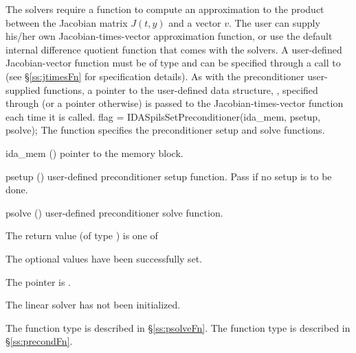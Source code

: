 {
The {\idaspils} solvers require a function to compute an approximation to the
product between the Jacobian matrix $J(t,y)$ and a vector $v$.
The user can supply his/her own Jacobian-times-vector approximation function, 
or use the default internal difference quotient function
that comes with the {\idaspils} solvers.
A user-defined Jacobian-vector function must be of type 
and can be specified through a call to 
(see \S\ref{ss:jtimesFn} for specification details).
As with the preconditioner user-supplied functions,
a pointer to the user-defined data structure, , specified through
 (or a  pointer otherwise) is passed to the 
Jacobian-times-vector function  each time it is called.  
{
  flag = IDASpilsSetPreconditioner(ida\_mem, psetup, psolve);
}
{
  The function  specifies the preconditioner
  setup and solve functions.
}
{
  \begin{args}
  \item[ida\_mem] ()
    pointer to the {\ida} memory block.
  \item[psetup] ()
    user-defined preconditioner setup function.  Pass  if no
    setup is to be done.
  \item[psolve] ()
    user-defined preconditioner solve function.
  \end{args}
}
{
  The return value  (of type ) is one of
  \begin{args}
  \item[\Id{IDASPILS\_SUCCESS}] 
    The optional values have been successfully set.
  \item[\Id{IDASPILS\_MEM\_NULL}]
    The  pointer is .
  \item[\Id{IDASPILS\_LMEM\_NULL}]
    The {\idaspils} linear solver has not been initialized.
  \end{args}
}
{
   The function type  is described in \S\ref{ss:psolveFn}.
   The function type  is described in \S\ref{ss:precondFn}.
}}
